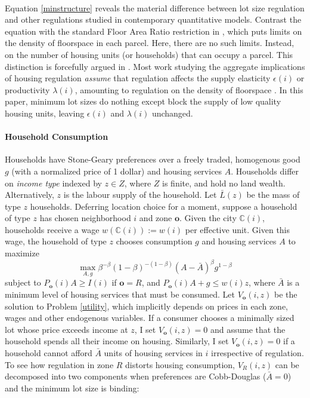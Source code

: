 \documentclass[11pt]{article}
\begin{document}
	\paragraph*{}
	Equation \eqref{minstructure} reveals the material difference between lot size regulation and other regulations studied in contemporary quantitative models. Contrast the equation with the standard Floor Area Ratio restriction in \cite{bruecknersingh}, which puts limits on the density of floorspace in each parcel. Here, there are no such limits. Instead,  on the number of housing units (or households) that can occupy a parcel. This distinction is forcefully argued in \cite{griesonwhite}. Most work studying the aggregate implications of housing regulation \textit{assume} that regulation affects the supply elasticity $\epsilon(i)$ or productivity $\lambda(i)$, amounting to regulation on the density of floorspace \citep{hseihmoretti, parkho, hop}. In this paper, minimum lot sizes do nothing except block the supply of low quality housing units, leaving $\epsilon(i)$ and $\lambda(i)$ unchanged.  

	
	\paragraph*{Household Consumption}
	Households have Stone-Geary preferences over a freely traded, homogenous good $g$ (with a normalized price of 1 dollar) and housing services $A$. Households differ on \textit{income type} indexed by $z \in Z$, where $Z$ is finite, and hold no land wealth. Alternatively, $z$ is the labour supply of the household. Let $\bar{L}(z)$ be the mass of type $z$ households. Deferring location choice for a moment, suppose a household of type $z$ has chosen neighborhood $i$ and zone $\boldsymbol{o}$. Given the city $\mathbb{C}(i)$, households receive a wage $w(\mathbb{C}(i)) := w(i)$ per effective unit. Given this wage, the household of type $z$ chooses consumption $g$ and housing services $A$ to maximize
	\begin{equation}\label{utility}
	\max_{A, g} \beta^{-\beta}(1-\beta)^{-(1-\beta)}(A - \bar{A})^{\beta}g^{1-\beta}
	\end{equation} 
	subject to $P_{\boldsymbol{o}}(i)A \geq I(i)$ if $\boldsymbol{o} = R$, and $P_{\boldsymbol{o}}(i)A + g \leq w(i)z$, where $\bar{A}$ is a minimum level of housing services that must be consumed. Let  $V_{\boldsymbol{o}}(i, z)$ be the solution to Problem \eqref{utility}, which implicitly depends on prices in each zone, wages and other endogenous variables. If a consumer chooses a minimally sized lot whose price exceeds income at $z$, I set  $V_{\boldsymbol{o}}(i, z) = 0$ and assume that the household spends all their income on housing. Similarly, I set $V_{\boldsymbol{o}}(i, z) = 0$ if a household cannot afford $\bar{A}$ units of housing services in $i$ irrespective of regulation. To see how regulation in zone $R$ distorts housing consumption, $V_{R}(i, z)$ can be decomposed into two components when preferences are Cobb-Douglas ($\bar{A} = 0$) and the minimum lot size is binding:
	
\end{document}
